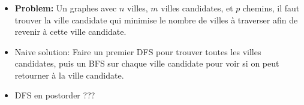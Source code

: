 \begin{frame}
    \frametitle{\problemtitle}
    \begin{itemize}
        \item<+-> \textbf{Problem:} Un graphes avec $n$ villes, $m$ villes candidates, et $p$ chemins, il faut trouver la ville candidate qui minimise le nombre de villes à traverser afin de revenir à cette ville candidate.
        \item<+-> Naive solution: Faire un premier DFS pour trouver toutes les villes candidates, puis un BFS sur chaque ville candidate pour voir si on peut retourner à la ville candidate.
        \item<+-> DFS en postorder ???
    \end{itemize}
\end{frame}
